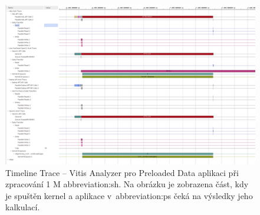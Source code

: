 \documentclass[a4paper, twoside, 11pt]{article}
\newcommand{\fbar}{\FloatBarrier}
\begin{document}
	\begin{figure}[htbp!]
		\centering
		\includegraphics[width=1\textwidth]{src/png/vitis-analyzer/legacy-rt/1M-data/writing-data-output/legacy-rt-step-0.000001-timeline-trace-execution.png}
		\caption{Timeline Trace – Vitis Analyzer pro Preloaded Data aplikaci při zpracování 1 M \gls{abbreviation:sh}. Na obrázku je zobrazena část, kdy je spuštěn kernel a aplikace v~\gls{abbreviation:ps} čeká na výsledky jeho kalkulací.}
		\label{fig:legacy-rt-step-0.000001-timeline-trace-execution}
	\end{figure}


	\fbar
\end{document}
